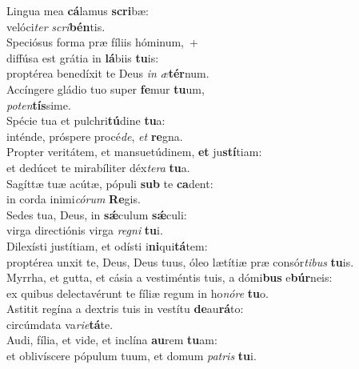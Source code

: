 \evenverse Lingua mea \textbf{cá}lamus \textbf{scri}bæ:~\*\\
\evenverse velóci\textit{ter} \textit{scri}\textbf{bén}tis.\\
\oddverse Speciósus forma præ fíliis hóminum,~+\\
\oddverse  diffúsa est grátia in \textbf{lá}biis \textbf{tu}is:~\*\\
\oddverse proptérea benedíxit te Deus \textit{in} \textit{æ}\textbf{tér}num.\\
\evenverse Accíngere gládio tuo super \textbf{fe}mur \textbf{tu}um,~\*\\
\evenverse \textit{po}\textit{ten}\textbf{tís}sime.\\
\oddverse Spécie tua et pulchri\textbf{tú}dine \textbf{tu}a:~\*\\
\oddverse inténde, próspere procé\textit{de}, \textit{et} \textbf{re}gna.\\
\evenverse Propter veritátem, et mansuetúdinem, \textbf{et} ju\textbf{stí}tiam:~\*\\
\evenverse et dedúcet te mirabíliter déx\textit{te}\textit{ra} \textbf{tu}a.\\
\oddverse Sagíttæ tuæ acútæ, pópuli \textbf{sub} te \textbf{ca}dent:~\*\\
\oddverse in corda inimi\textit{có}\textit{rum} \textbf{Re}gis.\\
\evenverse Sedes tua, Deus, in \textbf{sǽ}culum \textbf{sǽ}culi:~\*\\
\evenverse virga directiónis virga \textit{re}\textit{gni} \textbf{tu}i.\\
\oddverse Dilexísti justítiam, et odísti i\textbf{ni}qui\textbf{tá}tem:~\*\\
\oddverse proptérea unxit te, Deus, Deus tuus, óleo lætítiæ præ consór\textit{ti}\textit{bus} \textbf{tu}is.\\
\evenverse Myrrha, et gutta, et cásia a vestiméntis tuis, a dómi\textbf{bus} e\textbf{búr}neis:~\*\\
\evenverse ex quibus delectavérunt te fíliæ regum in ho\textit{nó}\textit{re} \textbf{tu}o.\\
\oddverse Astitit regína a dextris tuis in vestítu \textbf{de}au\textbf{rá}to:~\*\\
\oddverse circúmdata va\textit{ri}\textit{e}\textbf{tá}te.\\
\evenverse Audi, fília, et vide, et inclína \textbf{au}rem \textbf{tu}am:~\*\\
\evenverse et oblivíscere pópulum tuum, et domum \textit{pa}\textit{tris} \textbf{tu}i.\\

